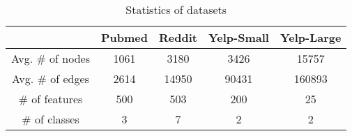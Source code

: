 \documentclass[sigconf]{acmart}
\begin{document}
\begin{table}[t]
    \small
    \centering
    \caption{Statistics of datasets}
    \vspace{-1.5em}
    \begin{tabular}{c|cccc}
    \hline \hline
         &  Pubmed & Reddit & Yelp-Small & Yelp-Large \\ \hline
      Avg. \# of nodes   & 1061 & 3180 & 3426 & 15757 \\
      Avg. \# of edges & 2614 & 14950 & 90431 & 160893 \\
      \# of features & 500 & 503 & 200 & 25 \\
      \# of classes & 3 & 7 & 2 & 2 \\ \hline
    \end{tabular}
    \vspace{-1.5em}
    \label{tab:data}
\end{table}
\end{document}
